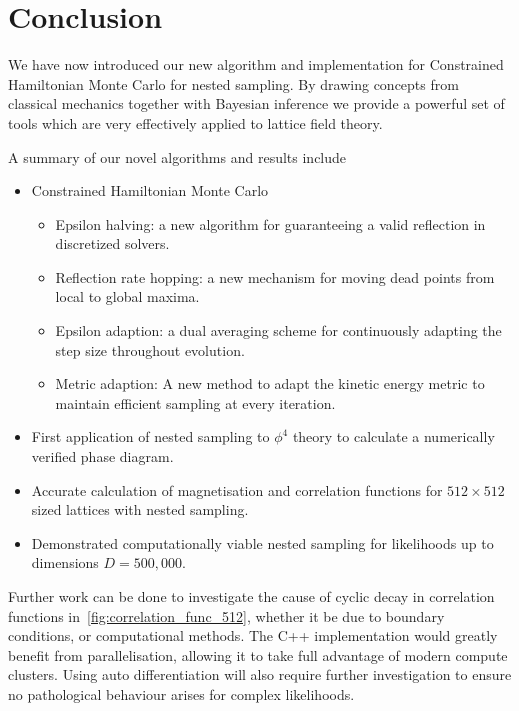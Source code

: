 \documentclass[11pt]{article}
\begin{document}
    \section{Conclusion}\label{sec:conclusion}
    We have now introduced our new algorithm and implementation for Constrained Hamiltonian Monte Carlo for nested sampling.
    By drawing concepts from classical mechanics together with Bayesian inference we provide a powerful
    set of tools which are very effectively applied to lattice field theory.

    A summary of our novel algorithms and results include
    \begin{itemize}
        \item Constrained Hamiltonian Monte Carlo
        \begin{itemize}
            \item Epsilon halving: a new algorithm for guaranteeing a valid reflection in discretized solvers.
            \item Reflection rate hopping: a new mechanism for moving dead points from local to global maxima.
            \item Epsilon adaption: a dual averaging scheme for continuously adapting the step size throughout evolution.
            \item Metric adaption: A new method to adapt the kinetic energy metric to maintain efficient sampling at every iteration.
        \end{itemize}
        \item First application of nested sampling to $\phi^4$ theory to calculate a numerically verified phase diagram.
        \item Accurate calculation of magnetisation and correlation functions for $512 \times 512$ sized lattices with nested sampling.
        \item Demonstrated computationally viable nested sampling for likelihoods up to dimensions $D=500,000$.
    \end{itemize}

    Further work can be done to investigate the cause of cyclic decay in correlation functions
    in~\cref{fig:correlation_func_512}, whether it be due to boundary conditions, or computational methods.
    The C++ implementation would greatly benefit from parallelisation, allowing it to take full advantage of
    modern compute clusters.
    Using auto differentiation will also require further investigation to ensure no pathological behaviour arises for
    complex likelihoods.
\end{document}
